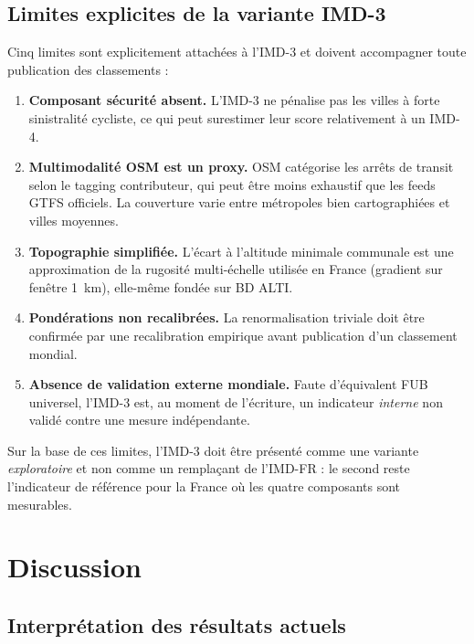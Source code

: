 \documentclass[11pt,a4paper]{article}
\begin{document}
\subsection{Limites explicites de la variante IMD-3}

Cinq limites sont explicitement attachées à l'IMD-3 et
doivent accompagner toute publication des classements :

\begin{enumerate}[leftmargin=*]
  \item \textbf{Composant sécurité absent.} L'IMD-3 ne
        pénalise pas les villes à forte sinistralité
        cycliste, ce qui peut surestimer leur score
        relativement à un IMD-4.
  \item \textbf{Multimodalité OSM est un proxy.} OSM
        catégorise les arrêts de transit selon le tagging
        contributeur, qui peut être moins exhaustif que les
        feeds GTFS officiels. La couverture varie entre
        métropoles bien cartographiées et villes moyennes.
  \item \textbf{Topographie simplifiée.} L'écart à
        l'altitude minimale communale est une
        approximation de la rugosité multi-échelle utilisée en
        France (gradient sur fenêtre 1~km), elle-même fondée
        sur BD ALTI.
  \item \textbf{Pondérations non recalibrées.} La
        renormalisation triviale doit être confirmée par une
        recalibration empirique avant publication d'un
        classement mondial.
  \item \textbf{Absence de validation externe mondiale.}
        Faute d'équivalent FUB universel, l'IMD-3 est, au
        moment de l'écriture, un indicateur \emph{interne}
        non validé contre une mesure indépendante.
\end{enumerate}

Sur la base de ces limites, l'IMD-3 doit être présenté comme
une variante \emph{exploratoire} et non comme un remplaçant de
l'IMD-FR : le second reste l'indicateur de référence pour la
France où les quatre composants sont mesurables.

\section{Discussion}
\label{sec:discussion}

\subsection{Interprétation des résultats actuels}
\end{document}
